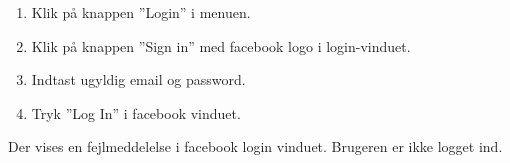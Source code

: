 		{
		\begin{enumerate}
			\item Klik på knappen ''Login'' i menuen.
			\item Klik på knappen ''Sign in'' med facebook logo i login-vinduet.
			\item Indtast ugyldig email og password.
			\item Tryk ''Log In'' i facebook vinduet.
		\end{enumerate}
		} %
		{Der vises en fejlmeddelelse i facebook login vinduet. Brugeren er ikke logget ind. } %
		{} %
		{} %

